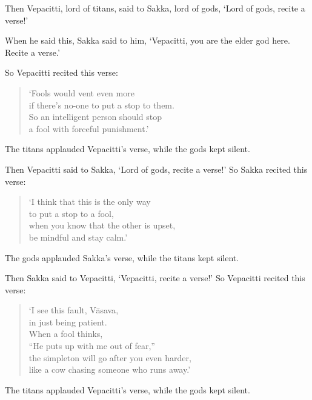 \documentclass[12pt,openany]{book}%
\begin{document}
Then Vepacitti, lord of titans, said to Sakka, lord of gods, ‘Lord of gods, recite a verse!’ 

When he said this, Sakka said to him, ‘Vepacitti, you are the elder god here. Recite a verse.’ 

So Vepacitti recited this verse: 

\begin{verse}%
‘Fools would vent even more \\
if there’s no-one to put a stop to them. \\
So an intelligent person should stop \\
a fool with forceful punishment.’ 

%
\end{verse}

The titans applauded Vepacitti’s verse, while the gods kept silent. 

Then Vepacitti said to Sakka, ‘Lord of gods, recite a verse!’ So Sakka recited this verse: 

\begin{verse}%
‘I think that this is the only way \\
to put a stop to a fool, \\
when you know that the other is upset, \\
be mindful and stay calm.’ 

%
\end{verse}

The gods applauded Sakka’s verse, while the titans kept silent. 

Then Sakka said to Vepacitti, ‘Vepacitti, recite a verse!’ So Vepacitti recited this verse: 

\begin{verse}%
‘I see this fault, \textsanskrit{Vāsava}, \\
in just being patient. \\
When a fool thinks, \\
“He puts up with me out of fear,” \\
the simpleton will go after you even harder, \\
like a cow chasing someone who runs away.’ 

%
\end{verse}

The titans applauded Vepacitti’s verse, while the gods kept silent. 
\end{document}
